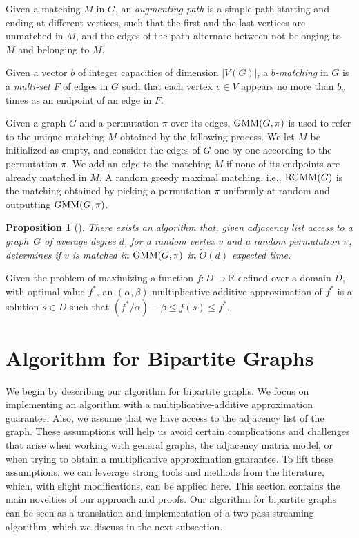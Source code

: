 \documentclass[letterpaper,11pt]{article}
\newcommand{\GMM}[0]{\ensuremath{\textup{GMM}}}
\newcommand{\RGMM}[0]{\ensuremath{\textup{RGMM}}}
\newtheorem{proposition}[lemma]{Proposition}
\begin{document}
Given a matching $M$ in $G$, an {\em augmenting path} is a simple path starting and ending at different vertices, such that the first and the last vertices are unmatched in $M$, and the edges of the path alternate between not belonging to $M$ and belonging to $M$.

Given a vector $b$ of integer capacities of dimension $|V(G)|$, a {\em $b$-matching} in $G$ is a {\em multi-set} $F$ of edges in $G$ such that each vertex $v\in V$ appears no more than $b_v$ times as an endpoint of an edge in $F$. 

Given a graph $G$ and a permutation $\pi$ over its edges, $\GMM(G, \pi)$ is used to refer to the unique matching $M$ obtained by the following process. We let $M$ be initialized as empty, and consider the edges of $G$ one by one according to the permutation $\pi$. We add an edge to the matching $M$ if none of its endpoints are already matched in $M$. A random greedy maximal matching, i.e., $\RGMM(G)$ is the 
matching obtained by picking a permutation $\pi$ uniformly at random and outputting $\GMM(G,\pi)$.



\begin{proposition}[\cite{Behnezhad21}]\label{prop:rgmm}
    There exists an algorithm that,
    given adjacency list access
    to a graph~$G$ of average degree $d$,
    for a random vertex $v$ and a random permutation $\pi$,
    determines if $v$ is matched in $\GMM(G, \pi)$ in $\widetilde{O}(d)$ expected time. 
\end{proposition}




Given the problem of maximizing a function $f:D\rightarrow \mathbb{R}$ defined over a domain $D$, with optimal value $f^*$, an $(\alpha,\beta)$-multiplicative-additive approximation of $f^*$ is a solution $s\in D$ such that $(f^*/\alpha) -\beta \leq f(s)\leq f^*$.




 






\section{Algorithm for Bipartite Graphs}\label{sec:bipartite}

We begin by describing our algorithm for bipartite graphs. We focus on implementing an algorithm with a multiplicative-additive approximation guarantee. Also, we assume that we have access to the adjacency list of the graph. These assumptions will help us avoid certain complications and challenges that arise when working with general graphs, the adjacency matrix model, or when trying to obtain a multiplicative approximation guarantee. To lift these assumptions, we can leverage strong tools and methods from the literature, which, with slight modifications, can be applied here. This section contains the main novelties of our approach and proofs. Our algorithm for bipartite graphs can be seen as a translation and implementation of a two-pass streaming algorithm, which we discuss in the next subsection.
\end{document}
